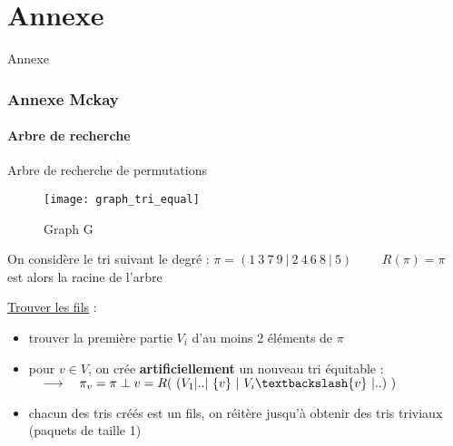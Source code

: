 \part{Annexe}
\begin{frame}[noframenumbering]{Annexe}
\begin{multicols}{2}
\tableofcontents
\end{multicols}
\end{frame}

\section{Annexe Mckay}
\subsection{Arbre de recherche}
\begin{frame}[noframenumbering]{Arbre de recherche de permutations}
    \begin{minipage}{0.3\textwidth}
        \begin{figure}[!htb]
            \centering
            \texttt{[image: graph\_tri\_equal]}
            \caption{\label{fig: Graph G2}Graph G}
        \end{figure}
    \end{minipage}
    \begin{minipage}{0.6\textwidth}
        \begin{center}
            On considère le tri suivant le degré :\newline
            $\pi = (1\ 3\ 7\ 9\ |\ 2\ 4\ 6\ 8\ |\ 5)\qquad $ \newline \newline
            $R(\pi)=\pi$ est alors la racine de l'arbre
        \end{center}
    \end{minipage}
    \newline \newline \newline
    \underline{Trouver les fils} :
    \begin{itemize}
        \item trouver la première partie $V_i$ d'au moins 2 éléments de $\pi$
        \item pour $v \in V$, on crée \textbf{artificiellement} un nouveau tri équitable :
        $\quad \longrightarrow \quad \pi_v = \pi \perp v = R(\ (V_1|..|\ \lbrace v \rbrace \ |\ V_i \textbackslash \lbrace v \rbrace\ |..)\ )$
        \item chacun des tris créés est un fils, on réitère jusqu'à obtenir des tris triviaux (paquets de taille 1)
    \end{itemize}
\end{frame}

